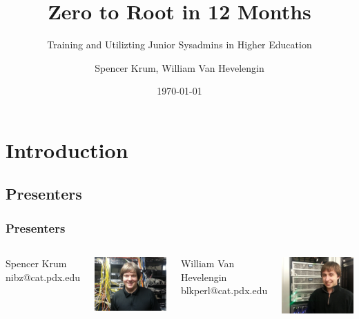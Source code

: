 \documentclass{beamer}
\title{Zero to Root in 12 Months}
\subtitle{Training and Utilizting Junior Sysadmins in Higher Education}
\date{\today}
\author{Spencer Krum, William Van Hevelengin}
\begin{document}
\frame{\titlepage}

\section{Introduction}
\subsection{Presenters}
\frame 
{
    \frametitle{Presenters}
        \begin{columns}[c]
        \begin{center}
        Spencer Krum\\
        nibz@cat.pdx.edu\\
        \end{center}
        \includegraphics[width=1\textwidth]{spencer.jpg}
        
        \begin{center}
        William Van Hevelengin\\
        blkperl@cat.pdx.edu\\
        \end{center}
        \includegraphics[width=1\textwidth]{blkperl.jpg}
        \end{columns}
}
\end{document}
